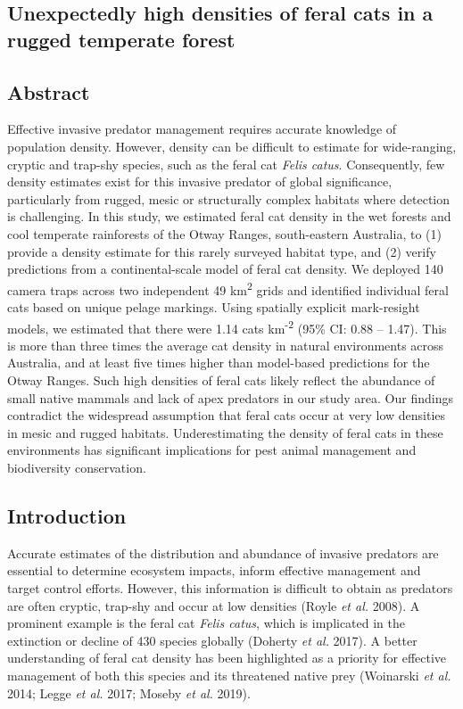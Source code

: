\documentclass[11pt,a4paper,titlepage,twoside,openright]{style/unimelbthesis}
\begin{document}
\begin{mainmatter}
{\chapter{Unexpectedly high densities of feral cats in a rugged temperate forest}\label{otways17}}

\hypertarget{abstract}{%
\section*{Abstract}\label{abstract}}

Effective invasive predator management requires accurate knowledge of population density. However, density can be difficult to estimate for wide-ranging, cryptic and trap-shy species, such as the feral cat \emph{Felis catus}. Consequently, few density estimates exist for this invasive predator of global significance, particularly from rugged, mesic or structurally complex habitats where detection is challenging. In this study, we estimated feral cat density in the wet forests and cool temperate rainforests of the Otway Ranges, south-eastern Australia, to (1) provide a density estimate for this rarely surveyed habitat type, and (2) verify predictions from a continental-scale model of feral cat density. We deployed 140 camera traps across two independent 49 km\textsuperscript{2} grids and identified individual feral cats based on unique pelage markings. Using spatially explicit mark-resight models, we estimated that there were 1.14 cats km\textsuperscript{-2} (95\% CI: 0.88 -- 1.47). This is more than three times the average cat density in natural environments across Australia, and at least five times higher than model-based predictions for the Otway Ranges. Such high densities of feral cats likely reflect the abundance of small native mammals and lack of apex predators in our study area. Our findings contradict the widespread assumption that feral cats occur at very low densities in mesic and rugged habitats. Underestimating the density of feral cats in these environments has significant implications for pest animal management and biodiversity conservation.

\newpage

\hypertarget{introduction}{%
\section{Introduction}\label{introduction}}

Accurate estimates of the distribution and abundance of invasive predators are essential to determine ecosystem impacts, inform effective management and target control efforts. However, this information is difficult to obtain as predators are often cryptic, trap-shy and occur at low densities (Royle \emph{et al.} 2008). A prominent example is the feral cat \emph{Felis catus}, which is implicated in the extinction or decline of 430 species globally (Doherty \emph{et al.} 2017). A better understanding of feral cat density has been highlighted as a priority for effective management of both this species and its threatened native prey (Woinarski \emph{et al.} 2014; Legge \emph{et al.} 2017; Moseby \emph{et al.} 2019).


\end{mainmatter}
\end{document}

